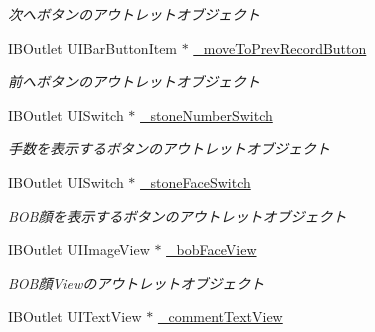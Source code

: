 \begin{DoxyCompactItemize}
\begin{DoxyCompactList}\small\item\em 次へボタンのアウトレットオブジェクト \end{DoxyCompactList}\item 
\hypertarget{interface_abstract_record_view_controller_aeacc6f8b5cc426aa4fe89e6109152b1f}{
IBOutlet UIBarButtonItem $\ast$ \hyperlink{interface_abstract_record_view_controller_aeacc6f8b5cc426aa4fe89e6109152b1f}{\_\-moveToPrevRecordButton}}
\label{interface_abstract_record_view_controller_aeacc6f8b5cc426aa4fe89e6109152b1f}

\begin{DoxyCompactList}\small\item\em 前へボタンのアウトレットオブジェクト \end{DoxyCompactList}\item 
\hypertarget{interface_abstract_record_view_controller_a1fa14d365bf0622321d357f438d0f024}{
IBOutlet UISwitch $\ast$ \hyperlink{interface_abstract_record_view_controller_a1fa14d365bf0622321d357f438d0f024}{\_\-stoneNumberSwitch}}
\label{interface_abstract_record_view_controller_a1fa14d365bf0622321d357f438d0f024}

\begin{DoxyCompactList}\small\item\em 手数を表示するボタンのアウトレットオブジェクト \end{DoxyCompactList}\item 
\hypertarget{interface_abstract_record_view_controller_a8f82b7b40c8e24c8650bb38c3dd2aca7}{
IBOutlet UISwitch $\ast$ \hyperlink{interface_abstract_record_view_controller_a8f82b7b40c8e24c8650bb38c3dd2aca7}{\_\-stoneFaceSwitch}}
\label{interface_abstract_record_view_controller_a8f82b7b40c8e24c8650bb38c3dd2aca7}

\begin{DoxyCompactList}\small\item\em BOB顔を表示するボタンのアウトレットオブジェクト \end{DoxyCompactList}\item 
\hypertarget{interface_abstract_record_view_controller_a1c3a85a9d14dcb7b9aeb320cf950aa36}{
IBOutlet UIImageView $\ast$ \hyperlink{interface_abstract_record_view_controller_a1c3a85a9d14dcb7b9aeb320cf950aa36}{\_\-bobFaceView}}
\label{interface_abstract_record_view_controller_a1c3a85a9d14dcb7b9aeb320cf950aa36}

\begin{DoxyCompactList}\small\item\em BOB顔Viewのアウトレットオブジェクト \end{DoxyCompactList}\item 
\hypertarget{interface_abstract_record_view_controller_a41fd69fa81bc98a15f5d42e410ba3271}{
IBOutlet UITextView $\ast$ \hyperlink{interface_abstract_record_view_controller_a41fd69fa81bc98a15f5d42e410ba3271}{\_\-commentTextView}}
\label{interface_abstract_record_view_controller_a41fd69fa81bc98a15f5d42e410ba3271}


\end{DoxyCompactItemize}
